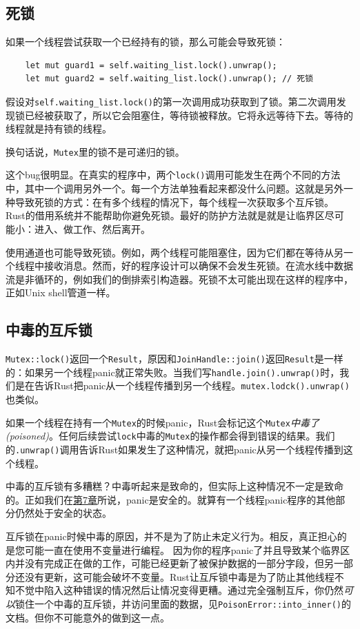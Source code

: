 \subsection{死锁}
如果一个线程尝试获取一个已经持有的锁，那么可能会导致死锁：
\begin{verbatim}
    let mut guard1 = self.waiting_list.lock().unwrap();
    let mut guard2 = self.waiting_list.lock().unwrap(); // 死锁
\end{verbatim}

假设对\texttt{self.waiting\_list.lock()}的第一次调用成功获取到了锁。第二次调用发现锁已经被获取了，所以它会阻塞住，等待锁被释放。它将永远等待下去。等待的线程就是持有锁的线程。

换句话说，\texttt{Mutex}里的锁不是可递归的锁。

这个bug很明显。在真实的程序中，两个\texttt{lock()}调用可能发生在两个不同的方法中，其中一个调用另外一个。每一个方法单独看起来都没什么问题。这就是另外一种导致死锁的方式：在有多个线程的情况下，每个线程一次获取多个互斥锁。Rust的借用系统并不能帮助你避免死锁。最好的防护方法就是就是让临界区尽可能小：进入、做工作、然后离开。

使用通道也可能导致死锁。例如，两个线程可能阻塞住，因为它们都在等待从另一个线程中接收消息。然而，好的程序设计可以确保不会发生死锁。在流水线中数据流是非循环的，例如我们的倒排索引构造器。死锁不太可能出现在这样的程序中，正如Unix shell管道一样。

\subsection{中毒的互斥锁}
\texttt{Mutex::lock()}返回一个\texttt{Result}，原因和\texttt{JoinHandle::join()}返回\texttt{Result}是一样的：如果另一个线程panic就正常失败。当我们写\texttt{handle.join().unwrap()}时，我们是在告诉Rust把panic从一个线程传播到另一个线程。\texttt{mutex.lodck().unwrap()}也类似。

如果一个线程在持有一个\texttt{Mutex}的时候panic，Rust会标记这个\texttt{Mutex}\emph{中毒了(poisoned)}。任何后续尝试\texttt{lock}中毒的\texttt{Mutex}的操作都会得到错误的结果。我们的\texttt{.unwrap()}调用告诉Rust如果发生了这种情况，就把panic从另一个线程传播到这个线程。

中毒的互斥锁有多糟糕？中毒听起来是致命的，但实际上这种情况不一定是致命的。正如我们在\hyperref[ch07]{第7章}所说，panic是安全的。就算有一个线程panic程序的其他部分仍然处于安全的状态。

互斥锁在panic时候中毒的原因，并不是为了防止未定义行为。相反，真正担心的是您可能一直在使用不变量进行编程。 因为你的程序panic了并且导致某个临界区内并没有完成正在做的工作，可能已经更新了被保护数据的一部分字段，但另一部分还没有更新，这可能会破坏不变量。Rust让互斥锁中毒是为了防止其他线程不知不觉中陷入这种错误的情况然后让情况变得更糟。通过完全强制互斥，你仍然\emph{可以}锁住一个中毒的互斥锁，并访问里面的数据，见\texttt{PoisonError::into\_inner()}的文档。但你不可能意外的做到这一点。


